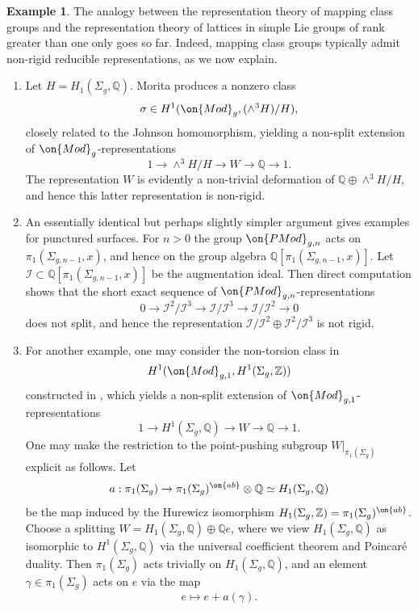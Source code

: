 \documentclass[12 pt]{amsart}
\theoremstyle{plain}
\theoremstyle{definition}
\newtheorem{example}[subsubsection]{Example}
\theoremstyle{remark}
\numberwithin{equation}{section}
\begin{document}
\begin{example}\label{non-rigid-examples}
The analogy between the representation theory of mapping class groups and the representation theory of lattices in simple Lie groups of rank greater than one only goes so far. Indeed, mapping class groups typically admit non-rigid reducible representations, as we now explain. 
\begin{enumerate}
\item Let $H=H_1(\Sigma_g, \mathbb{Q})$. Morita \cite{morita1993extension} produces a nonzero class $$\sigma\in H^1(\on{Mod}_g, (\wedge^3 H)/H),$$ closely related to the Johnson homomorphism, yielding a non-split extension of $\on{Mod}_g$-representations $$1\to \wedge^3H/H\to W\to \mathbb{Q}\to 1.$$ The representation $W$ is evidently a non-trivial deformation of $\mathbb{Q}\oplus \wedge^3H/H$, and hence this latter representation is non-rigid.

\item An essentially identical but perhaps slightly simpler argument gives examples for punctured surfaces. For $n>0$ the group $\on{PMod}_{g,n}$ acts on $\pi_1(\Sigma_{g,n-1}, x)$, and hence on the group algebra $\mathbb{Q}[\pi_1(\Sigma_{g,n-1}, x)]$. Let $\mathscr{I}\subset \mathbb{Q}[\pi_1(\Sigma_{g,n-1}, x)]$ be the augmentation ideal. Then direct computation shows that the short exact sequence of $\on{PMod}_{g,n}$-representations $$0\to \mathscr{I}^2/\mathscr{I}^3\to \mathscr{I}/\mathscr{I}^3\to \mathscr{I}/\mathscr{I}^2\to 0$$ does not split, and hence the representation $\mathscr{I}/\mathscr{I}^2\oplus \mathscr{I}^2/\mathscr{I}^3$ is not rigid.

\item \label{h1-example} For another example, one may consider the non-torsion class in $$H^1(\on{Mod}_{g,1}, H^1(\Sigma_g, \mathbb{Z}))$$ constructed in \cite[Proposition 6.4]{morita1989families}, which yields a non-split extension of $\on{Mod}_{g,1}$-representations $$1\to H^1(\Sigma_g, \mathbb{Q})\to W\to \mathbb{Q}\to 1.$$ One may make the restriction to the point-pushing subgroup $W|_{\pi_1(\Sigma_g)}$ explicit as follows. Let $$a: \pi_1(\Sigma_g)\to \pi_1(\Sigma_g)^{\on{ab}}\otimes\mathbb{Q}\simeq H_1(\Sigma_g, \mathbb{Q})$$  be the map induced by the Hurewicz isomorphism $H_1(\Sigma_g, \mathbb{Z})=\pi_1(\Sigma_g)^{\on{ab}}$. Choose a splitting $W=H_1(\Sigma_g, \mathbb{Q})\oplus \mathbb{Q}e$, where we view $H_1(\Sigma_g, \mathbb{Q})$ as isomorphic to $H^1(\Sigma_g, \mathbb{Q})$ via the universal coefficient theorem and Poincar\'e duality. Then $\pi_1(\Sigma_g)$ acts trivially on $H_1(\Sigma_g, \mathbb{Q})$, and an element $\gamma\in\pi_1(\Sigma_g)$ acts on $e$ via the map $$e\mapsto e+a(\gamma).$$  
\end{enumerate}
\end{example}
\end{document}
